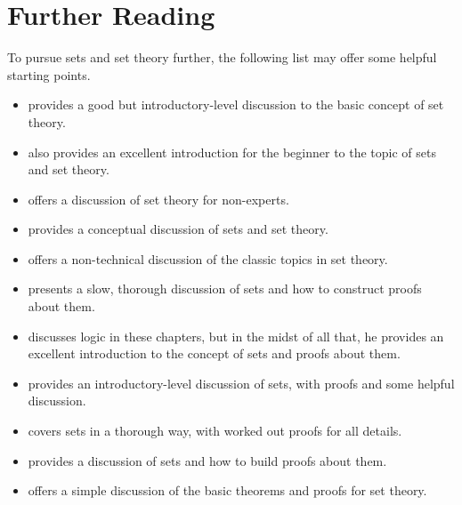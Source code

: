 \documentclass[../../../main.tex]{subfiles}
\begin{document}
\chapter{Further Reading}

To pursue sets and set theory further, the following list may offer some helpful starting points.

\begin{itemize}

  \item \citet[ch.~3]{StewartAndTall2015} provides a good but introductory-level discussion to the basic concept of set theory.
  
  \item \citet[ch.~1]{Steinhart2018} also provides an excellent introduction for the beginner to the topic of sets and set theory.
  
  \item \citet[ch.~4]{Stewart1995} offers a discussion of set theory for non-experts.
  
  \item \citet[ch.~14]{Flegg1974} provides a conceptual discussion of sets and set theory.

  \item \citet{Halmos2017} offers a non-technical discussion of the classic topics in set theory.
  
  \item \citet[ch.~3]{Cummings2020} presents a slow, thorough discussion of sets and how to construct proofs about them.

  \item \citet[chs.~1--2]{Velleman2019} discusses logic in these chapters, but in the midst of all that, he provides an excellent introduction to the concept of sets and proofs about them.
  
  \item \citet[ch.~1]{Zach2019} provides an introductory-level discussion of sets, with proofs and some helpful discussion.
  
  \item \citet[chs.~1--2]{Warner2019} covers sets in a thorough way, with worked out proofs for all details.
  
  \item \citet[ch.~9]{MaddenAndAubrey2017} provides a discussion of sets and how to build proofs about them.

  \item \citet[ch.~1]{Pinter2014} offers a simple discussion of the basic theorems and proofs for set theory.


\end{itemize}
\end{document}
